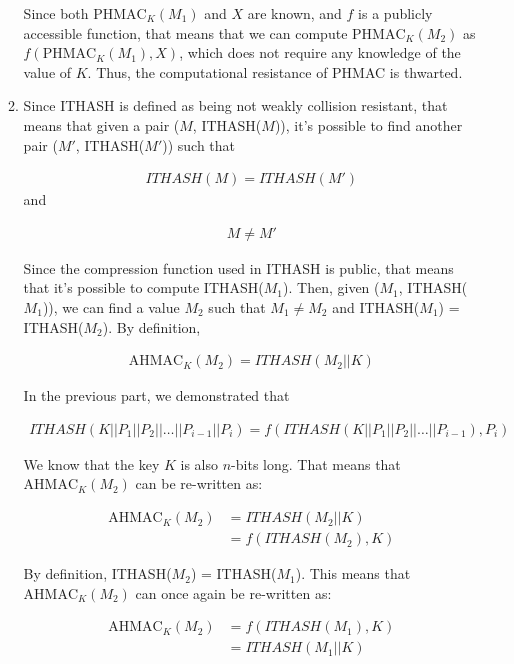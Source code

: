 \documentclass[11pt]{article}
\theoremstyle{definition}
\newcommand{\AHMAC}{\mathrm{AHMAC}}
\newcommand{\PHMAC}{\mathrm{PHMAC}}
\begin{document}
\begin{enumerate}
\begin{enumerate}
Since both $\PHMAC_K{(M_1)}$ and $X$ are known, and $f$ is a publicly accessible function, that means that we can compute $\PHMAC_K{(M_2)}$ as $f(\PHMAC_K{(M_1)}, X)$, which does not require any knowledge of the value of $K$. Thus, the computational resistance of PHMAC is thwarted. \\


\item %

Since ITHASH is defined as being not weakly collision resistant, that means that given a pair ($M$, ITHASH($M$)), it's possible to find another pair ($M'$, ITHASH($M'$)) such that 

\begin{align*}
    ITHASH(M) = ITHASH(M')
\end{align*} and 

\begin{align*}
    M \neq M'
\end{align*}

Since the compression function used in ITHASH is public, that means that it's possible to compute ITHASH($M_1$). Then, given ($M_1$, ITHASH($M_1$)), we can find a value $M_2$ such that $M_1 \neq M_2$ and ITHASH($M_1$) = ITHASH($M_2$). By definition,

\begin{align*}
    \AHMAC_K{(M_2)} = ITHASH(M_2 || K)
\end{align*}

In the previous part, we demonstrated that 

\begin{align*}
    ITHASH(K || P_1 || P_2 || \ldots || P_{i - 1} || P_i) = f(ITHASH(K || P_1 || P_2 || \ldots || P_{i - 1}), P_i)
\end{align*}

We know that the key $K$ is also $n$-bits long. That means that $\AHMAC_K{(M_2)}$ can be re-written as:

\begin{align*}
    \AHMAC_K{(M_2)} &= ITHASH(M_2 || K) \\
    &= f(ITHASH(M_2), K)
\end{align*}

By definition, ITHASH($M_2$) = ITHASH($M_1$). This means that $\AHMAC_K{(M_2)}$ can once again be re-written as:

\begin{align*}
    \AHMAC_K{(M_2)} &= f(ITHASH(M_1), K) \\
    &= ITHASH(M_1 || K)
\end{align*}


\end{enumerate}
\end{enumerate}
\end{document}
